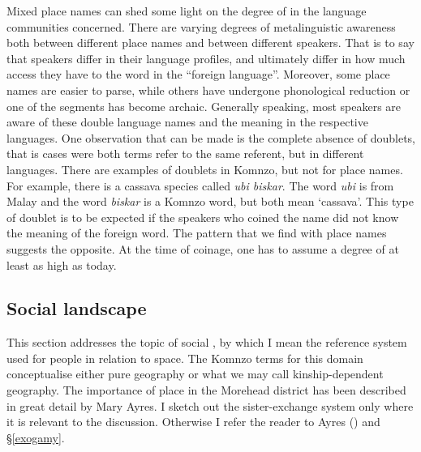 Mixed place names can shed some light on the degree of  in the language communities concerned. There are varying degrees of metalinguistic awareness both between different place names and between different speakers. That is to say that speakers differ in their language profiles, and ultimately differ in how much access they have to the word in the ``foreign language''. Moreover, some place names are easier to parse, while others have undergone phonological reduction or one of the segments has become archaic. Generally speaking, most speakers are aware of these double language names and the meaning in the respective languages. One observation that can be made is the complete absence of doublets, that is cases were both terms refer to the same referent, but in different languages. There are examples of doublets in Komnzo, but not for place names. For example, there is a cassava species called \emph{ubi biskar}. The word \emph{ubi} is from Malay and the word \emph{biskar} is a Komnzo word, but both mean `cassava'. This type of doublet is to be expected if the speakers who coined the name did not know the meaning of the foreign word. The pattern that we find with place names suggests the opposite. At the time of coinage, one has to assume a degree of  at least as high as today.

\subsection{Social landscape}\label{sociallandscape}

This section addresses the topic of social , by which I mean the reference system used for people in relation to space. The Komnzo terms for this domain conceptualise either pure geography or what we may call kinship-dependent geography. The importance of place in the Morehead district has been described in great detail by Mary Ayres. I sketch out the sister-exchange system only where it is relevant to the discussion. Otherwise I refer the reader to Ayres (\citeyear{Ayres:ws}) and \S\ref{exogamy}.

